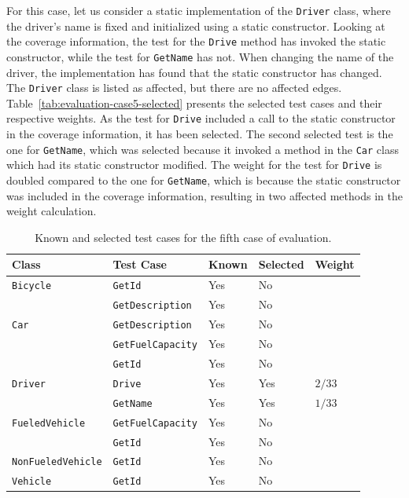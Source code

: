 \documentclass[a4paper,english,12pt]{report}
\newcommand{\textcf}{\texttt}
\begin{document}
For this case, let us consider a static implementation of the \textcf{Driver} class, where the driver's name is fixed and initialized using a static constructor. Looking at the coverage information, the test for the \textcf{Drive} method has invoked the static constructor, while the test for \textcf{GetName} has not. When changing the name of the driver, the implementation has found that the static constructor has changed. The \textcf{Driver} class is listed as affected, but there are no affected edges. Table~\vref{tab:evaluation-case5-selected} presents the selected test cases and their respective weights. As the test for \textcf{Drive} included a call to the static constructor in the coverage information, it has been selected. The second selected test is the one for \textcf{GetName}, which was selected because it invoked a method in the \textcf{Car} class which had its static constructor modified. The weight for the test for \textcf{Drive} is doubled compared to the one for \textcf{GetName}, which is because the static constructor was included in the coverage information, resulting in two affected methods in the weight calculation.

\begin{table}[htbp]
  \centering
  \begin{tabular}{|l|l|l|l|l|}
    \hline
    \textbf{Class} & \textbf{Test Case} & \textbf{Known} & \textbf{Selected} & \textbf{Weight}\\
    \hline
    \textcf{Bicycle} & \textcf{GetId} & Yes & No &\\
            & \textcf{GetDescription} & Yes & No &\\
    \hline
    \textcf{Car} & \textcf{GetDescription} & Yes & No &\\
        & \textcf{GetFuelCapacity} & Yes & No &\\
        & \textcf{GetId} & Yes & No &\\
    \hline
    \textcf{Driver} & \textcf{Drive} & Yes & Yes & $2/33$\\
           & \textcf{GetName} & Yes & Yes & $1/33$\\
    \hline
    \textcf{FueledVehicle} & \textcf{GetFuelCapacity} & Yes & No &\\
                  & \textcf{GetId} & Yes & No &\\
    \hline
    \textcf{NonFueledVehicle} & \textcf{GetId} & Yes & No &\\
    \hline
    \textcf{Vehicle} & \textcf{GetId} & Yes & No &\\
    \hline
  \end{tabular}
  \caption{Known and selected test cases for the fifth case of evaluation.}
  \label{tab:evaluation-case5-selected}
\end{table}
\end{document}
